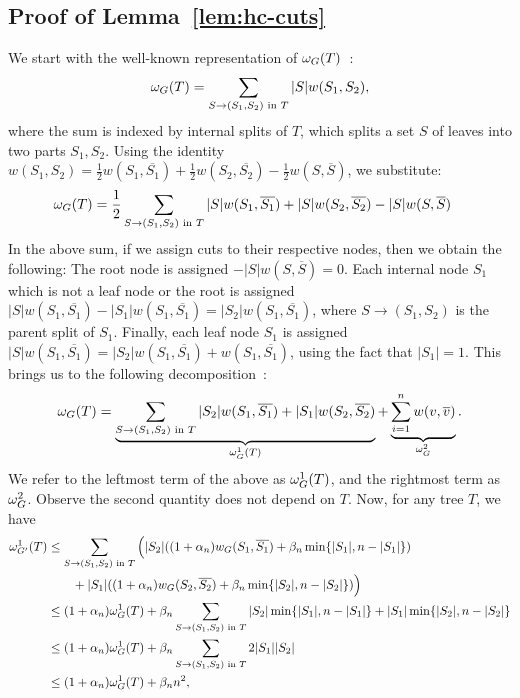 \subsection{Proof of Lemma~\ref{lem:hc-cuts}}\label{app:hc-cuts}
    We start with the well-known representation of $\omega_G(T)$~\citep{dasgupta2016cost}:
    \[
        \omega_G(T) = \sum_{S \rightarrow (S_1, S_2) \text{ in $T$}} |S|w(S_1, S_2),
    \]
    where the sum is indexed by internal splits of $T$, which splits a set $S$ of leaves into two parts $S_1, S_2$. Using the identity $w(S_1, S_2) = \frac{1}{2}w(S_1, \overline{S_1}) + \frac{1}{2}w(S_2, \overline{S_2}) - \frac{1}{2}w(S, \overline{S})$, we substitute:
    \begin{align*}
        \omega_G(T) &= \frac{1}{2}\sum_{S \rightarrow (S_1, S_2) \text{ in $T$}} |S|w(S_1, \overline{S_1}) + |S|w(S_2, \overline{S_2}) - |S|w(S, \overline{S})
    \end{align*}
    In the above sum, if we assign cuts to their respective nodes, then we obtain the following: The root node is assigned $-|S|w(S, \overline{S}) = 0$. Each internal node $S_1$ which is not a leaf node or the root is assigned $|S|w(S_1, \overline{S_1}) - |S_1|w(S_1, \overline{S_1}) = |S_2| w(S_1, \overline{S_1})$, where $S \rightarrow (S_1, S_2)$ is the parent split of $S_1$. Finally, each leaf node $S_1$ is assigned $|S|w(S_1, \overline{S_1}) = |S_2|w(S_1, \overline{S_1}) + w(S_1, \overline{S_1})$, using the fact that $|S_1| = 1$. This brings us to the following decomposition~\citep{agarwal2022sublinear}:
    \[
        \omega_G(T) = \underbrace{\sum_{S \rightarrow (S_1, S_2) \text{ in $T$}}|S_2| w(S_1, \overline{S_1}) + |S_1| w(S_2, \overline{S_2})}_{\omega_G^1(T)} + \underbrace{\sum_{i = 1}^n w(v, \overline{v})}_{\omega_G^2}.
    \]
    We refer to the leftmost term of the above as $\omega_G^1(T)$, and the rightmost term as $\omega_G^2$. Observe the second quantity does not depend on $T$. Now, for any tree $T$, we have
    \begin{align*}
        \omega_{G'}^1(T) &\leq \sum_{S \rightarrow (S_1, S_2) \text{ in $T$}}\Big( |S_2| ((1+\alpha_n)w_{G}(S_1, \overline{S_1}) + \beta_n \min\{|S_1|, n - |S_1|\}) \\ &\qquad + |S_1| ((1+\alpha_n )w_{G}(S_2, \overline{S_2}) + \beta_n \min\{|S_2|, n - |S_2|\})\Big) \\
        &\leq (1+\alpha_n)\omega_{G}^1(T) + \beta_n \sum_{S \rightarrow (S_1, S_2) \text{ in $T$}} |S_2| \min\{|S_1|, n - |S_1|\} + |S_1| \min\{|S_2|, n - |S_2|\} \\
        &\leq (1+\alpha_n)\omega_{G}^1(T) + \beta_n \sum_{S \rightarrow (S_1, S_2) \text{ in $T$}} 2|S_1| |S_2| \\
        &\leq (1+\alpha_n)\omega_{G}^1(T) + \beta_n n^2,
    \end{align*}
